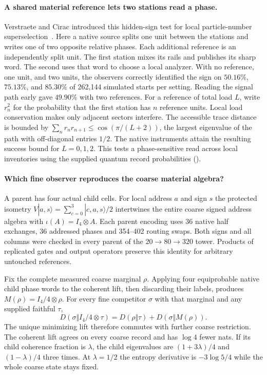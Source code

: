 \documentclass[11pt]{article}
\begin{document}
\paragraph{A shared material reference lets two stations read a phase.}
Verstraete and Cirac introduced this hidden-sign test for local
particle-number superselection~\cite{verstraeteCirac2003}. Here a native
source splits one unit between the stations and writes one of two
opposite relative phases. Each additional reference is an independently
split unit. The first station mixes its rails and publishes its sharp
word. The second uses that word to choose a local analyzer. With no
reference, one unit, and two units, the observers correctly identified
the sign on $50.16\%$, $75.13\%$, and $85.30\%$ of 262,144 simulated
starts per setting. Reading the signal path early gave $49.90\%$ with
two references. For a reference of total load $L$, write $r_n^2$ for
the probability that the first station has $n$ reference units. Local
load conservation makes only adjacent sectors interfere. The accessible
trace distance is bounded by $\sum_n r_n r_{n+1}\leq\cos(\pi/(L+2))$,
the largest eigenvalue of the path with off-diagonal entries $1/2$.
The native instruments attain the resulting success bound for
$L=0,1,2$. This tests a phase-sensitive read across local inventories
using the supplied quantum record probabilities
().

\paragraph{Which fine observer reproduces the coarse material algebra?}
A parent has four actual child cells. For local address \(a\) and sign \(s\)
the protected isometry \(V|a,s\rangle=\sum_{c=0}^3|c,a,s\rangle/2\)
intertwines the entire coarse signed address algebra with
\(\iota(A)=I_4\otimes A\). Each parent encoding uses 36 native half
exchanges, 36 addressed phases and 354--402 routing swaps. Both signs and
all columns were checked in every parent of the \(20\to80\to320\) tower.
Products of replicated gates and output operators preserve this identity
for arbitrary untouched references.

Fix the complete measured coarse marginal \(\rho\). Applying four
equiprobable native child phase words to the coherent lift, then discarding
their labels, produces \(M(\rho)=I_4/4\otimes\rho\). For every fine
competitor \(\sigma\) with that marginal and any supplied faithful \(\tau\),
\[
 D(\sigma\Vert I_4/4\otimes\tau)
 =D(\rho\Vert\tau)+D(\sigma\Vert M(\rho)).
\]
The unique minimizing lift therefore commutes with further coarse
restriction. The coherent lift agrees on every coarse record and has
\(\log4\) fewer nats. If its child coherence fraction is \(\lambda\), the
child eigenvalues are \((1+3\lambda)/4\) and \((1-\lambda)/4\) three times.
At \(\lambda=1/2\) the entropy derivative is \(-3\log5/4\) while the whole
coarse state stays fixed.
\end{document}

